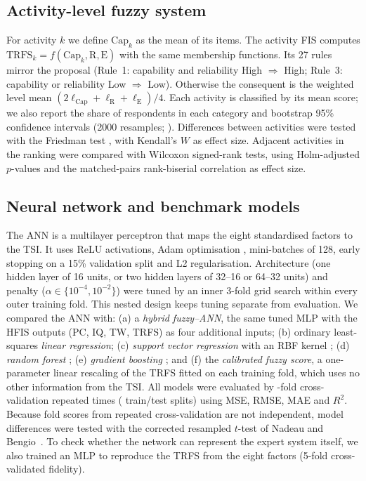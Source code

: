 \documentclass[fleqn,10pt]{wlscirep}
\theoremstyle{remark}
\begin{document}
\subsection{Activity-level fuzzy system}
For activity $k$ we define $\mathrm{Cap}_k$ as the mean of its items. The activity FIS computes $\mathrm{TRFS}_k=f(\mathrm{Cap}_k,\mathrm{R},\mathrm{E})$ with the same membership functions. Its 27 rules mirror the proposal (Rule~1: capability and reliability High $\Rightarrow$ High; Rule~3: capability or reliability Low $\Rightarrow$ Low). Otherwise the consequent is the weighted level mean $(2\ell_{\mathrm{Cap}}+\ell_{\mathrm{R}}+\ell_{\mathrm{E}})/4$. Each activity is classified by its mean score; we also report the share of respondents in each category and bootstrap 95\% confidence intervals (2000 resamples; \cite{efron1993}). Differences between activities were tested with the Friedman test \cite{friedman1937}, with Kendall's $W$ as effect size. Adjacent activities in the ranking were compared with Wilcoxon signed-rank tests, using Holm-adjusted $p$-values \cite{holm1979} and the matched-pairs rank-biserial correlation as effect size.

\subsection{Neural network and benchmark models}
The ANN is a multilayer perceptron \cite{rumelhart1986} that maps the eight standardised factors to the TSI. It uses ReLU activations, Adam optimisation \cite{kingma2015}, mini-batches of 128, early stopping on a 15\% validation split and L2 regularisation. Architecture (one hidden layer of 16 units, or two hidden layers of 32--16 or 64--32 units) and penalty ($\alpha\in\{10^{-4},10^{-2}\}$) were tuned by an inner 3-fold grid search within every outer training fold. This nested design keeps tuning separate from evaluation. We compared the ANN with:
(a) a \emph{hybrid fuzzy--ANN}, the same tuned MLP with the HFIS outputs (PC, IQ, TW, TRFS) as four additional inputs;
(b) ordinary least-squares \emph{linear regression};
(c) \emph{support vector regression} with an RBF kernel \cite{smola2004};
(d) \emph{random forest} \cite{breiman2001};
(e) \emph{gradient boosting} \cite{friedman2001}; and
(f) the \emph{calibrated fuzzy score}, a one-parameter linear rescaling of the TRFS fitted on each training fold, which uses no other information from the TSI.
All models were evaluated by \CVsplits-fold cross-validation repeated \CVrepeats{} times (\CVfits{} train/test splits) using MSE, RMSE, MAE and $R^2$. Because fold scores from repeated cross-validation are not independent, model differences were tested with the corrected resampled $t$-test of Nadeau and Bengio~\cite{nadeau2003}. To check whether the network can represent the expert system itself, we also trained an MLP to reproduce the TRFS from the eight factors (5-fold cross-validated fidelity).
\end{document}

